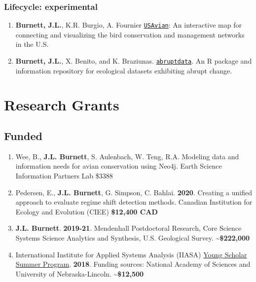 \documentclass[11pt,]{article}
\providecommand{\tightlist}{%
  \setlength{\itemsep}{0pt}\setlength{\parskip}{0pt}}
\begin{document}
\hypertarget{lifecycle-experimental}{%
\subsubsection{Lifecycle: experimental}\label{lifecycle-experimental}}

\begin{enumerate}
\def\labelenumi{\arabic{enumi}.}
\item
  \textbf{Burnett, J.L.}, K.R. Burgio, A. Fournier
  \href{https://github.com/TrashBirdEcology/USAvian/}{\texttt{USAvian}}:
  An interactive map for connecting and visualizing the bird
  conservation and management networks in the U.S.
\item
  \textbf{Burnett, J.L.}, X. Benito, and K. Braziunas.
  \href{http://github.com/regime-shifts/abruptdata}{\texttt{abruptdata}}.
  An R package and information repository for ecological datasets
  exhibiting abrupt change.
\end{enumerate}

\hypertarget{research-grants}{%
\section{Research Grants}\label{research-grants}}

\hypertarget{funded}{%
\subsection{Funded}\label{funded}}

\begin{enumerate}
\def\labelenumi{\arabic{enumi}.}
\tightlist
\item
  Wee, B., \textbf{J.L. Burnett}, S. Aulenbach, W. Teng, R.A. Modeling
  data and information needs for avian conservation using Neo4j. Earth
  Science Information Partners Lab \hfill \$3388
\item
  Pedersen, E., \textbf{J.L. Burnett}, G. Simpson, C. Bahlai.
  \textbf{2020}. Creating a unified approach to evaluate regime shift
  detection methods. Canadian Institution for Ecology and Evolution
  (CIEE) \hfill \textbf{\$12,400 CAD}
\item
  \textbf{J.L. Burnett}. \textbf{2019-21}. Mendenhall Postdoctoral
  Research, Core Science Systems Science Analytics and Synthesis, U.S.
  Geological Survey. \hfill \textbf{\textasciitilde{}\$222,000}
\item
  International Institute for Applied Systems Analysis (IIASA)
  \href{https://iiasa.ac.at/web/home/education/yssp/Young_Scientists_Summer_Program.html}{Young
  Scholar Summer Program}. \textbf{2018}. Funding sources: National
  Academy of Sciences and University of Nebraska-Lincoln.
  \hfill \textbf{\textasciitilde{}\$12,500}
\end{enumerate}
\end{document}
